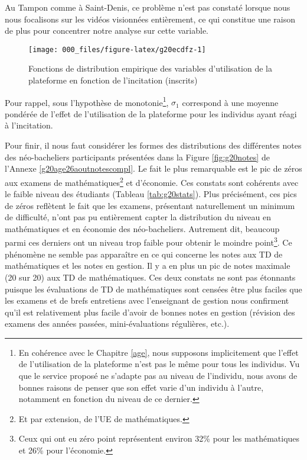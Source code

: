 \documentclass[
]{book}
\begin{document}
Au Tampon comme à Saint-Denis, ce problème n'est pas constaté lorsque nous nous focalisons sur les vidéos visionnées entièrement, ce qui constitue une raison de plus pour concentrer notre analyse sur cette variable.

\begin{figure}[H]

{\centering \texttt{[image: 000\_files/figure-latex/g20ecdfz-1]} 

}

\caption{Fonctions de distribution empirique des variables d'utilisation de la plateforme en fonction de l'incitation (inscrits)}\label{fig:g20ecdfz}
\end{figure}

Pour rappel, sous l'hypothèse de monotonie\footnote{En cohérence avec le Chapitre \ref{age}, nous supposons implicitement que l'effet de l'utilisation de la plateforme n'est pas le même pour tous les individus. Vu que le service proposé ne s'adapte pas au niveau de l'individu, nous avons de bonnes raisons de penser que son effet varie d'un individu à l'autre, notamment en fonction du niveau de ce dernier.}, \(\sigma_1\) correspond à une moyenne pondérée de l'effet de l'utilisation de la plateforme pour les individus ayant réagi à l'incitation.

\quad Pour finir, il nous faut considérer les formes des distributions des différentes notes des néo-bacheliers participants présentées dans la Figure \ref{fig:g20notes} de l'Annexe \ref{g20age26aoutnotescompl}. Le fait le plus remarquable est le pic de zéros aux examens de mathématiques\footnote{Et par extension, de l'UE de mathématiques.} et d'économie. Ces constats sont cohérents avec le faible niveau des étudiants (Tableau \ref{tab:g20stats}). Plus précisément, ces pics de zéros reflètent le fait que les examens, présentant naturellement un minimum de difficulté, n'ont pas pu entièrement capter la distribution du niveau en mathématiques et en économie des néo-bacheliers. Autrement dit, beaucoup parmi ces derniers ont un niveau trop faible pour obtenir le moindre point\footnote{Ceux qui ont eu zéro point représentent environ 32\% pour les mathématiques et 26\% pour l'économie.}.
Ce phénomène ne semble pas apparaître en ce qui concerne les notes aux TD de mathématiques et les notes en gestion. Il y a en plus un pic de notes maximale (20 sur 20) aux TD de mathématiques. Ces deux constats ne sont pas étonnants puisque les évaluations de TD de mathématiques sont censées être plus faciles que les examens et de brefs entretiens avec l'enseignant de gestion nous confirment qu'il est relativement plus facile d'avoir de bonnes notes en gestion (révision des examens des années passées, mini-évaluations régulières, etc.).
\end{document}
